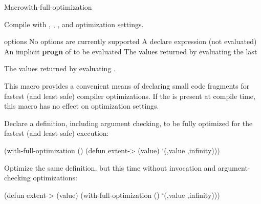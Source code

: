 \documentclass[10pt,twoside,english,pdftex]{article}
\begin{document}

\begin{functiondoc}{Macro}{with-full-optimization}%
  {\code{(}\superstar{}\code{)}
    \superstar{}
    \superstar{} 
    \returns{} \superstar}
%
  
\fnsyntax

\fnpurpose Compile  with ,
, , and
 optimization settings.

\fnpackage {}

\fnmodule {}

\fnargs
\begin{args}{options}
\arg[option] No options are currently supported
\arg[declaration] A declare expression (not evaluated)
\arg[forms] An implicit \textbf{progn} of  to be evaluated
\arg[results] The values returned by evaluating the last 
\end{args}

\fnreturns The values returned by evaluating .

\fndescription This macro provides a convenient means of declaring small code
fragments for fastest (and least safe) compiler optimizations.  If the
  is present at
compile time, this macro has no effect on optimization settings.

\fnexamples Declare a  definition, including argument checking,
to be fully optimized for the fastest (and least safe) execution:
%
\W\supp
\begin{example}
  (with-full-optimization ()
    (defun extent-> (value)
      `(,value ,infinity)))
\end{example}
%
Optimize the same  definition, but this time without
invocation and argument-checking optimizations:
%
\W\supp\notpretop
\begin{example}
  (defun extent-> (value)
    (with-full-optimization ()
      `(,value ,infinity)))
\end{example}

\end{functiondoc}

\end{document}
